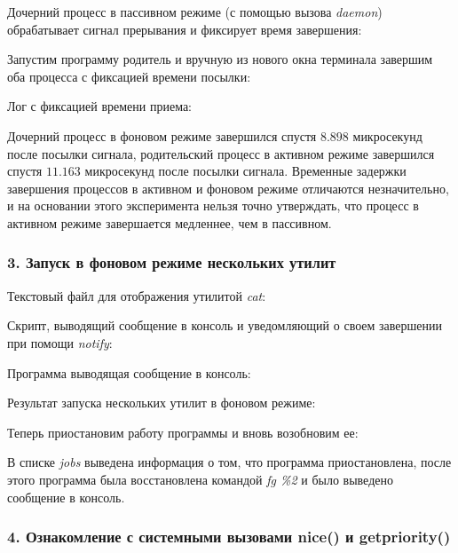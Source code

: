 \documentclass[14pt,a4paper,report]{report}
\begin{document}


Дочерний процесс в пассивном режиме (с помощью вызова \emph{daemon}) обрабатывает сигнал прерывания и фиксирует время завершения:



Запустим программу родитель и вручную из нового окна терминала завершим оба процесса с фиксацией времени посылки:



Лог с фиксацией времени приема:



Дочерний процесс в фоновом режиме завершился спустя $8.898$ микросекунд после посылки сигнала, родительский процесс в активном режиме завершился спустя $11.163$ микросекунд после посылки сигнала. Временные задержки завершения процессов в активном и фоновом режиме отличаются незначительно, и на основании этого эксперимента нельзя точно утверждать, что процесс в активном режиме завершается медленнее, чем в пассивном.

\subsubsection{3. Запуск в фоновом режиме нескольких утилит}

Текстовый файл для отображения утилитой \emph{cat}:



Скрипт, выводящий сообщение в консоль и уведомляющий о своем завершении при помощи \emph{notify}:



Программа выводящая сообщение в консоль:



Результат запуска нескольких утилит в фоновом режиме:



Теперь приостановим работу программы и вновь возобновим ее:



В списке \emph{jobs} выведена информация о том, что программа приостановлена, после этого программа была восстановлена командой \emph{fg \%2} и было выведено сообщение в консоль.

\subsubsection{4. Ознакомление с системными вызовами nice() и getpriority()}
\end{document}
